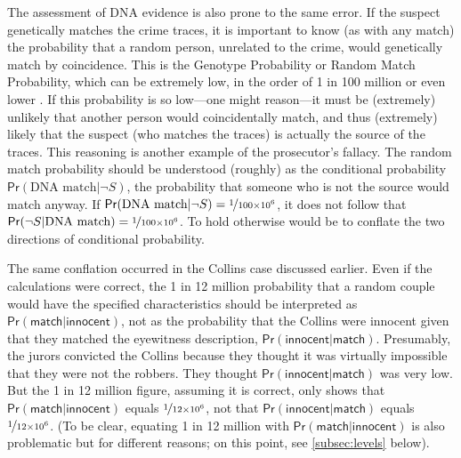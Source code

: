 \documentclass{article}
\newcommand{\pr}{\mathsf{Pr}}
\begin{document}
The assessment of DNA evidence is also prone to the same error. 
If the suspect genetically matches the crime traces, it is important to know (as with any match) the probability that a random person, unrelated to the crime, would genetically match by coincidence. %
This is the Genotype Probability or Random Match Probability, which can be extremely low, in the order of 1 in 100 million or even lower \citep{Kaye2000ReferDNA,Wasserman2008Forensic}. If this probability is so low---one might reason---it must be (extremely) unlikely that another person would coincidentally match, and thus (extremely) likely that the suspect (who matches the traces) is actually the source of the traces. 
This reasoning is another example of the prosecutor's fallacy.
The random match probability should be understood (roughly) as the conditional probability
$\pr(\textrm{DNA match}\vert \neg S)$, the probability that someone who is not the source would match anyway. If $\pr(\textrm{DNA match}\vert \neg S)=\nicefrac{1}{100\times 10^6}$, it does not follow 
that $\pr(\neg S \vert \textrm{DNA match})=\nicefrac{1}{100\times 10^6}$. To hold otherwise would be to conflate the two directions of conditional probability. 

The same conflation occurred in the Collins case discussed earlier. Even if the calculations were correct, the 1 in 12 million probability that a random couple would have the specified characteristics should be interpreted as 
$\pr(\textsf{match}\vert \textsf{innocent})$, not as the probability that the Collins were innocent given that they matched the eyewitness description, $\pr(\textsf{innocent}\vert \textsf{match})$. Presumably, the jurors convicted the Collins because they thought it was virtually impossible that they were not the robbers. They thought  
$\pr(\textsf{innocent}\vert \textsf{match})$ was very low. 
But the 1 in 12 
million figure, assuming it is correct, only shows that \linebreak  $\pr(\textsf{match}\vert \textsf{innocent})$ equals $\nicefrac{1}{12\times 10^6}$, not that $\pr(\textsf{innocent}\vert \textsf{match})$ equals $\nicefrac{1}{12\times 10^6}$. (To be clear, equating 1 in 12 million with $\pr(\textsf{match}\vert \textsf{innocent})$
is also problematic but for different reasons; on this point, see  \ref{subsec:levels} below).
\end{document}
